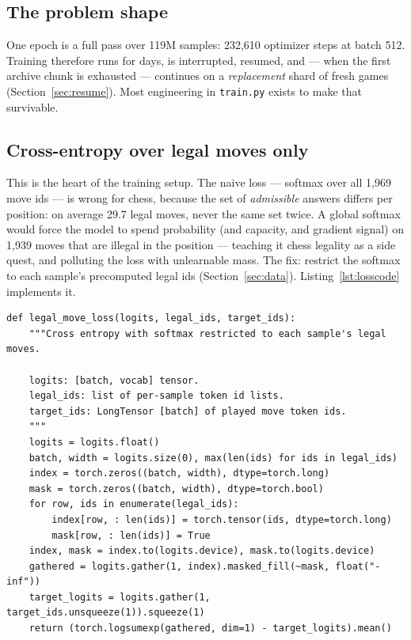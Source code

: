 \documentclass[10pt,a4paper]{article}
\newcommand{\code}[1]{\texttt{#1}}
\begin{document}
\subsection{The problem shape}

One epoch is a full pass over 119M samples: 232{,}610 optimizer steps at
batch 512. Training therefore runs for days, is interrupted, resumed, and
--- when the first archive chunk is exhausted --- continues on a
\emph{replacement} shard of fresh games (Section~\ref{sec:resume}). Most
engineering in \code{train.py} exists to make that survivable.

\subsection{Cross-entropy over legal moves only}\label{sec:losssec}

This is the heart of the training setup. The naive loss --- softmax over
all 1{,}969 move ids --- is wrong for chess, because the set of
\emph{admissible} answers differs per position: on average 29.7 legal
moves, never the same set twice. A global softmax would force the model
to spend probability (and capacity, and gradient signal) on 1{,}939
moves that are illegal in the position --- teaching it chess legality as
a side quest, and polluting the loss with unlearnable mass. The fix:
restrict the softmax to each sample's precomputed legal ids
(Section~\ref{sec:data}). Listing~\ref{lst:losscode} implements it.

\begin{lstlisting}[style=code, caption={Cross-entropy with softmax
restricted to each sample's legal moves (\code{model.py}).},
label={lst:losscode}, float=htbp]
def legal_move_loss(logits, legal_ids, target_ids):
    """Cross entropy with softmax restricted to each sample's legal moves.

    logits: [batch, vocab] tensor.
    legal_ids: list of per-sample token id lists.
    target_ids: LongTensor [batch] of played move token ids.
    """
    logits = logits.float()
    batch, width = logits.size(0), max(len(ids) for ids in legal_ids)
    index = torch.zeros((batch, width), dtype=torch.long)
    mask = torch.zeros((batch, width), dtype=torch.bool)
    for row, ids in enumerate(legal_ids):
        index[row, : len(ids)] = torch.tensor(ids, dtype=torch.long)
        mask[row, : len(ids)] = True
    index, mask = index.to(logits.device), mask.to(logits.device)
    gathered = logits.gather(1, index).masked_fill(~mask, float("-inf"))
    target_logits = logits.gather(1, target_ids.unsqueeze(1)).squeeze(1)
    return (torch.logsumexp(gathered, dim=1) - target_logits).mean()
\end{lstlisting}
\end{document}
